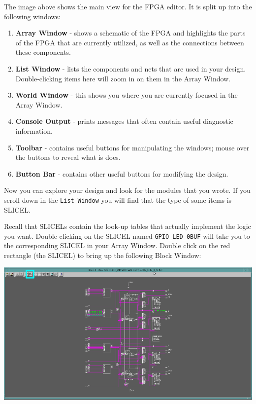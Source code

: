 \documentclass[11pt]{article}
\begin{document}
The image above shows the main view for the FPGA editor. It is split up into the following windows:

\begin{enumerate}
	\item \textbf{Array Window} - shows a schematic of the FPGA and highlights the parts of the FPGA that are currently utilized, as well as the connections between these components.
	\item \textbf{List Window} - lists the components and nets that are used in your design. Double-clicking items here will zoom in on them in the Array Window.
	\item \textbf{World Window} - this shows you where you are currently focused in the Array Window.
	\item \textbf{Console Output} - prints messages that often contain useful diagnostic information.
	\item \textbf{Toolbar} - contains useful buttons for manipulating the windows; mouse over the buttons to reveal what is does.
	\item \textbf{Button Bar} - contains other useful buttons for modifying the design.
\end{enumerate}

Now you can explore your design and look for the modules that you wrote. If you scroll down in the \verb|List Window| you will find that the type of some items is SLICEL.

Recall that SLICELs contain the look-up tables that actually implement the logic you want. Double clicking on the SLICEL named \verb|GPIO_LED_0BUF| will take you to the corresponding SLICEL in your Array Window. Double click on the red rectangle (the SLICEL) to bring up the following Block Window:

\begin{center}
	\includegraphics[width=\textwidth]{images/fpga_editor_2.png}
\end{center}
\end{document}

